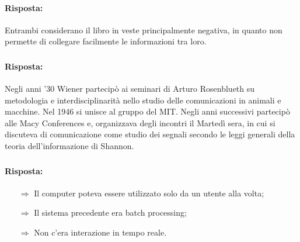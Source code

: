 
\paragraph{Risposta:} Entrambi considerano il libro in veste principalmente negativa,
in quanto non permette di collegare facilmente le informazioni tra loro.

\subsubsection{}


\paragraph{Risposta:} Negli anni '30 Wiener partecipò ai seminari di Arturo Rosenblueth su metodologia e interdisciplinarità
nello studio delle comunicazioni in animali e macchine. Nel 1946 si unisce al gruppo del MIT.
Negli anni successivi partecipò alle Macy Conferences e, organizzava degli incontri il Martedì sera, in cui si 
discuteva di comunicazione come studio dei segnali secondo le leggi generali della teoria dell'informazione di Shannon.

\subsubsection{}


\paragraph{Risposta:}

\begin{itemize}
    \item [$\Rightarrow$] Il computer poteva essere utilizzato solo da un utente alla volta;
    \item [$\Rightarrow$] Il sistema precedente era batch processing;
    \item [$\Rightarrow$] Non c'era interazione in tempo reale.
\end{itemize}

